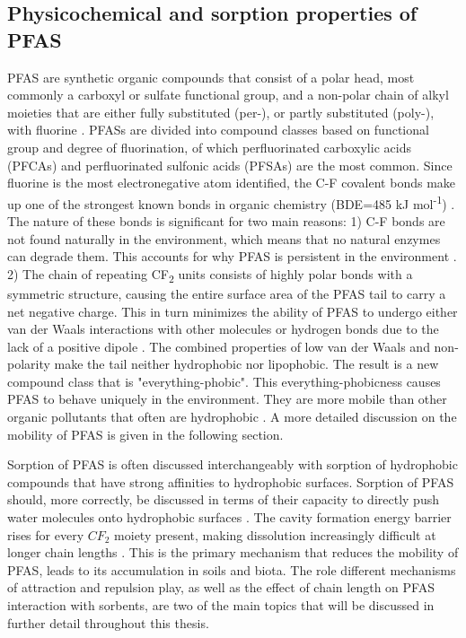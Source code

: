 \subsection{Physicochemical and sorption properties of PFAS}\label{sec:physchem} 
PFAS are synthetic organic compounds that consist of a polar head, most commonly a carboxyl or sulfate functional group, and a non-polar chain of alkyl moieties that are either fully substituted (per-), or partly substituted (poly-), with fluorine \citep{wang2011physchem}. PFASs are divided into compound classes based on functional group and degree of fluorination, of which perfluorinated carboxylic acids (\acrshort{PFCA}s) and perfluorinated sulfonic acids (PFSAs) are the most common. Since fluorine is the most electronegative atom identified, the C-F covalent bonds make up one of the strongest known bonds in organic chemistry (BDE=485 kJ mol\textsuperscript{-1}) \citep{Lau2007}. The nature of these bonds is significant for two main reasons: 1) C-F bonds are not found naturally in the environment, which means that no natural enzymes can degrade them. This accounts for why PFAS is persistent in the environment \citep{hale2020persistent,krafft2015per}. 2) The chain of repeating CF\textsubscript{2} units consists of highly polar bonds with a symmetric structure, causing the entire surface area of the PFAS tail to carry a net negative charge. This in turn minimizes the ability of PFAS to undergo either van der Waals interactions with other molecules or hydrogen bonds due to the lack of a positive dipole \citep{Arp2006}. The combined properties of low van der Waals and non-polarity make the tail neither hydrophobic nor lipophobic. The result is a new compound class that is "everything-phobic". This everything-phobicness causes \acrshort{PFAS} to behave uniquely in the environment. They are more mobile than other organic pollutants that often are hydrophobic \citep{hale2020persistent}. A more detailed discussion on the mobility of PFAS is given in the following section.  

Sorption of PFAS is often discussed interchangeably with sorption of hydrophobic compounds that have strong affinities to hydrophobic surfaces. Sorption of PFAS should, more correctly, be discussed in terms of their capacity to directly push water molecules onto hydrophobic surfaces \citep{Arp2006}. The cavity formation energy barrier rises for every $CF_2$ moiety present, making dissolution increasingly difficult at longer chain lengths \citep{bhhatarai2011,Arp2006}. This is the primary mechanism that reduces the mobility of PFAS, leads to its accumulation in soils and biota. The role different mechanisms of attraction and repulsion play, as well as the effect of chain length on PFAS interaction with sorbents, are two of the main topics that will be discussed in further detail throughout this thesis. 

